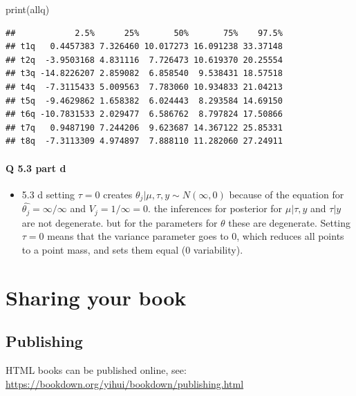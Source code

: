 \documentclass[
]{book}
\newenvironment{Shaded}{\begin{snugshade}}{\end{snugshade}}
\newcommand{\FunctionTok}[1]{\textcolor[rgb]{0.00,0.00,0.00}{#1}}
\newcommand{\NormalTok}[1]{#1}
\providecommand{\tightlist}{%
  \setlength{\itemsep}{0pt}\setlength{\parskip}{0pt}}
\theoremstyle{definition}
\theoremstyle{definition}
\theoremstyle{definition}
\theoremstyle{definition}
\theoremstyle{remark}
\begin{document}
\begin{Shaded}
\begin{Highlighting}[]
\FunctionTok{print}\NormalTok{(allq)}
\end{Highlighting}
\end{Shaded}

\begin{verbatim}
##            2.5%      25%       50%       75%    97.5%
## t1q   0.4457383 7.326460 10.017273 16.091238 33.37148
## t2q  -3.9503168 4.831116  7.726473 10.619370 20.25554
## t3q -14.8226207 2.859082  6.858540  9.538431 18.57518
## t4q  -7.3115433 5.009563  7.783060 10.934833 21.04213
## t5q  -9.4629862 1.658382  6.024443  8.293584 14.69150
## t6q -10.7831533 2.029477  6.586762  8.797824 17.50866
## t7q   0.9487190 7.244206  9.623687 14.367122 25.85331
## t8q  -7.3113309 4.974897  7.888110 11.282060 27.24911
\end{verbatim}

\hypertarget{q-5.3-part-d}{%
\subsubsection{Q 5.3 part d}\label{q-5.3-part-d}}

\begin{itemize}
\tightlist
\item
  5.3 d
  setting \(\tau =0\) creates \(\theta_j | \mu, \tau, y \sim N(\infty, 0)\) because of the equation for \(\hat{\theta_j} = \infty/\infty\) and \(V_j = 1/\infty =0\). the inferences for posterior for \(\mu | \tau, y\) and \(\tau | y\) are not degenerate. but for the parameters for \(\theta\) these are degenerate. Setting \(\tau =0\) means that the variance parameter goes to 0, which reduces all points to a point mass, and sets them equal (0 variability).
\end{itemize}

\hypertarget{sharing-your-book}{%
\chapter{Sharing your book}\label{sharing-your-book}}

\hypertarget{publishing}{%
\section{Publishing}\label{publishing}}

HTML books can be published online, see: \url{https://bookdown.org/yihui/bookdown/publishing.html}
\end{document}
